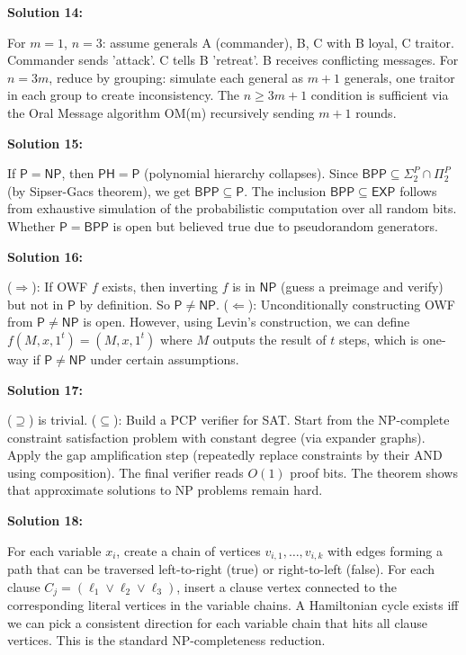\documentclass[12pt,a4paper]{exam}
\begin{document}
\textbf{Solution 14:}

For $m=1$, $n=3$: assume generals A (commander), B, C with B loyal, C traitor. Commander sends 'attack'. C tells B 'retreat'. B receives conflicting messages. For $n=3m$, reduce by grouping: simulate each general as $m+1$ generals, one traitor in each group to create inconsistency. The $n \geq 3m+1$ condition is sufficient via the Oral Message algorithm OM(m) recursively sending $m+1$ rounds.

\vspace{0.5cm}

\textbf{Solution 15:}

If $\mathsf{P} = \mathsf{NP}$, then $\mathsf{PH} = \mathsf{P}$ (polynomial hierarchy collapses). Since $\mathsf{BPP} \subseteq \Sigma_2^P \cap \Pi_2^P$ (by Sipser-Gacs theorem), we get $\mathsf{BPP} \subseteq \mathsf{P}$. The inclusion $\mathsf{BPP} \subseteq \mathsf{EXP}$ follows from exhaustive simulation of the probabilistic computation over all random bits. Whether $\mathsf{P} = \mathsf{BPP}$ is open but believed true due to pseudorandom generators.

\vspace{0.5cm}

\textbf{Solution 16:}

($\Rightarrow$): If OWF $f$ exists, then inverting $f$ is in $\mathsf{NP}$ (guess a preimage and verify) but not in $\mathsf{P}$ by definition. So $\mathsf{P} \neq \mathsf{NP}$. ($\Leftarrow$): Unconditionally constructing OWF from $\mathsf{P} \neq \mathsf{NP}$ is open. However, using Levin's construction, we can define $f(M,x,1^t) = (M,x,1^t)$ where $M$ outputs the result of $t$ steps, which is one-way if $\mathsf{P} \neq \mathsf{NP}$ under certain assumptions.

\vspace{0.5cm}

\textbf{Solution 17:}

($\supseteq$) is trivial. ($\subseteq$): Build a PCP verifier for SAT. Start from the NP-complete constraint satisfaction problem with constant degree (via expander graphs). Apply the gap amplification step (repeatedly replace constraints by their AND using composition). The final verifier reads $O(1)$ proof bits. The theorem shows that approximate solutions to NP problems remain hard.

\vspace{0.5cm}

\textbf{Solution 18:}

For each variable $x_i$, create a chain of vertices $v_{i,1}, \ldots, v_{i,k}$ with edges forming a path that can be traversed left-to-right (true) or right-to-left (false). For each clause $C_j = (\ell_1 \lor \ell_2 \lor \ell_3)$, insert a clause vertex connected to the corresponding literal vertices in the variable chains. A Hamiltonian cycle exists iff we can pick a consistent direction for each variable chain that hits all clause vertices. This is the standard NP-completeness reduction.
\end{document}
